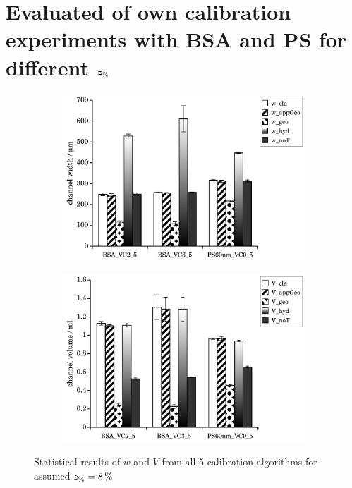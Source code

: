 \section*{Evaluated of own calibration experiments with BSA and PS for different $\bm{z_\text{\%}}$}
\renewcommand{\subFigSize}{0.49\linewidth}
\begin{figure}[htp]
  \begin{center}
    \begin{subfigure}{\subFigSize}
      \includegraphics[width=\linewidth]{./images/data/eval_own_p8/ownData_w_p8.pdf}
    \end{subfigure}
    \begin{subfigure}{\subFigSize}
      \includegraphics[width=\linewidth]{./images/data/eval_own_p8/ownData_V_p8.pdf}
    \end{subfigure}
  \end{center}
  \vspace*{-4ex}    
  \caption[Statistical results of $w$ and $V$ from all 5 calibration algorithms for assumed $\zP = \SI{8}{\percent}$]{
    Statistical results of $w$ and $V$ from all 5 calibration algorithms for assumed $\zP = \SI{8}{\percent}$
  }
  \label{fig:statCalibResP8}
\end{figure}  
